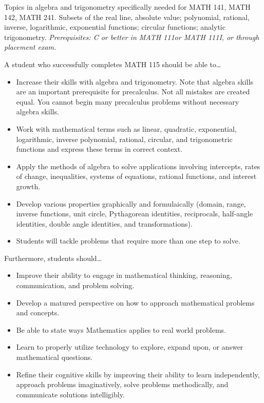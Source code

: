 \documentclass[11pt,letterpaper]{article}
\begin{document}

Topics in algebra and trigonometry specifically needed for MATH 141, MATH 142, MATH 241. Subsets of the real line, absolute value; polynomial, rational, inverse, logarithmic, exponential functions; circular functions; analytic trigonometry. {\itshape Prerequisites: C or better in MATH 111or MATH 111I, or through placement exam.}
\sectionbreak




A student who successfully completes MATH 115 should be able to\dots
	\begin{itemize} \itemsep=0.3ex
	\item Increase their skills with algebra and trigonometry. Note that algebra skills are an important prerequisite for precalculus. Not all mistakes are created equal. You cannot begin many precalculus problems without necessary algebra skills.
	\item Work with mathematical terms such as linear, quadratic, exponential, logarithmic, inverse polynomial, rational, circular, and trigonometric functions and express these terms in correct context.
	\item Apply the methods of algebra to solve applications involving intercepts, rates of change, inequalities, systems of equations, rational functions, and interest growth.
	\item Develop various properties graphically and formulaically (domain, range, inverse functions, unit circle, Pythagorean identities, reciprocals, half-angle identities, double angle identities, and transformations).
	\item Students will tackle problems that require more than one step to solve.
	\end{itemize}
Furthermore, students should\dots
	\begin{itemize} \itemsep=0.3ex
	\item  Improve their ability to engage in mathematical thinking, reasoning, communication, and problem solving.
	\item Develop a matured perspective on how to approach mathematical problems and concepts.
	\item Be able to state ways Mathematics applies to real world problems.
	\item Learn to properly utilize technology to explore, expand upon, or answer mathematical questions.
	\item Refine their cognitive skills by improving their ability to learn independently, approach problems imaginatively, solve problems methodically, and communicate solutions intelligibly.
	\end{itemize}
\par\vspace{0.4cm}
\end{document}
